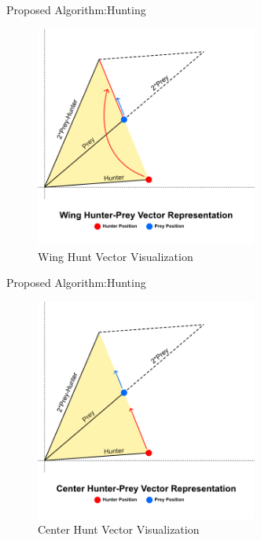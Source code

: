 \documentclass[xcolor=table]{beamer}
\begin{document}
\begin{frame}{Proposed Algorithm:Hunting}
  \begin{figure}[h]
  \begin{center}
  \includegraphics[width=0.65\textwidth]{img/pa/wing-hunt}
  \caption{Wing Hunt Vector Visualization}
  \end{center}
  \end{figure}
\end{frame}
\begin{frame}{Proposed Algorithm:Hunting}
  \begin{figure}[h]
  \begin{center}
  \includegraphics[width=0.65\textwidth]{img/pa/center-hunt}
  \caption{Center Hunt Vector Visualization}
  \end{center}
  \end{figure}
\end{frame}
\end{document}
